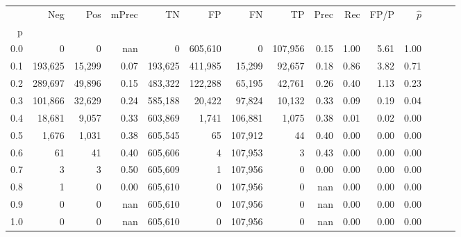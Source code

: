 \begin{tabular}{rrrrrrrrrrrrrrr}
\toprule
{} &      Neg &     Pos & mPrec &       TN &       FP &       FN &       TP &  Prec &   Rec &  FP/P & $\hat{p}$ \\
p   &          &         &       &          &          &          &          &       &       &       &           \\
\midrule
0.0 &        0 &       0 &   nan &        0 &  605,610 &        0 &  107,956 &  0.15 &  1.00 &  5.61 &      1.00 \\
0.1 &  193,625 &  15,299 &  0.07 &  193,625 &  411,985 &   15,299 &   92,657 &  0.18 &  0.86 &  3.82 &      0.71 \\
0.2 &  289,697 &  49,896 &  0.15 &  483,322 &  122,288 &   65,195 &   42,761 &  0.26 &  0.40 &  1.13 &      0.23 \\
0.3 &  101,866 &  32,629 &  0.24 &  585,188 &   20,422 &   97,824 &   10,132 &  0.33 &  0.09 &  0.19 &      0.04 \\
0.4 &   18,681 &   9,057 &  0.33 &  603,869 &    1,741 &  106,881 &    1,075 &  0.38 &  0.01 &  0.02 &      0.00 \\
0.5 &    1,676 &   1,031 &  0.38 &  605,545 &       65 &  107,912 &       44 &  0.40 &  0.00 &  0.00 &      0.00 \\
0.6 &       61 &      41 &  0.40 &  605,606 &        4 &  107,953 &        3 &  0.43 &  0.00 &  0.00 &      0.00 \\
0.7 &        3 &       3 &  0.50 &  605,609 &        1 &  107,956 &        0 &  0.00 &  0.00 &  0.00 &      0.00 \\
0.8 &        1 &       0 &  0.00 &  605,610 &        0 &  107,956 &        0 &   nan &  0.00 &  0.00 &      0.00 \\
0.9 &        0 &       0 &   nan &  605,610 &        0 &  107,956 &        0 &   nan &  0.00 &  0.00 &      0.00 \\
1.0 &        0 &       0 &   nan &  605,610 &        0 &  107,956 &        0 &   nan &  0.00 &  0.00 &      0.00 \\
\bottomrule
\end{tabular}
